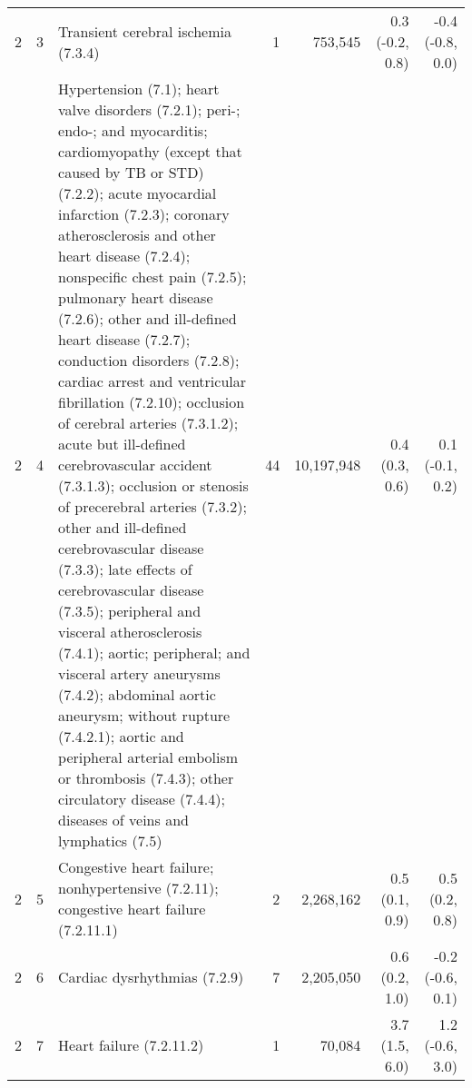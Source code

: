 \begin{tabular}{llp{6.5cm}rrrr}
   2 &  3 & Transient cerebral ischemia (7.3.4) &  1 & 753,545 & 0.3 (-0.2, 0.8) & -0.4 (-0.8, 0.0) \\ 
   2 &  4 & Hypertension (7.1); heart valve disorders (7.2.1); peri-; endo-; and myocarditis; cardiomyopathy (except that caused by TB or STD) (7.2.2); acute myocardial infarction (7.2.3); coronary atherosclerosis and other heart disease (7.2.4); nonspecific chest pain (7.2.5); pulmonary heart disease (7.2.6); other and ill-defined heart disease (7.2.7); conduction disorders (7.2.8); cardiac arrest and ventricular fibrillation (7.2.10); occlusion of cerebral arteries (7.3.1.2); acute but ill-defined cerebrovascular accident (7.3.1.3); occlusion or stenosis of precerebral arteries (7.3.2); other and ill-defined cerebrovascular disease (7.3.3); late effects of cerebrovascular disease (7.3.5); peripheral and visceral atherosclerosis (7.4.1); aortic; peripheral; and visceral artery aneurysms (7.4.2); abdominal aortic aneurysm; without rupture (7.4.2.1); aortic and peripheral arterial embolism or thrombosis (7.4.3); other circulatory disease (7.4.4); diseases of veins and lymphatics (7.5) & 44 & 10,197,948 & 0.4 (0.3, 0.6) & 0.1 (-0.1, 0.2) \\ 
   2 &  5 & Congestive heart failure; nonhypertensive (7.2.11); congestive heart failure (7.2.11.1) &  2 & 2,268,162 & 0.5 (0.1, 0.9) & 0.5 (0.2, 0.8) \\ 
   2 &  6 & Cardiac dysrhythmias (7.2.9) &  7 & 2,205,050 & 0.6 (0.2, 1.0) & -0.2 (-0.6, 0.1) \\ 
   2 &  7 & Heart failure (7.2.11.2) &  1 & 70,084 & 3.7 (1.5, 6.0) & 1.2 (-0.6, 3.0) \\ 
   \hline
\end{tabular}

